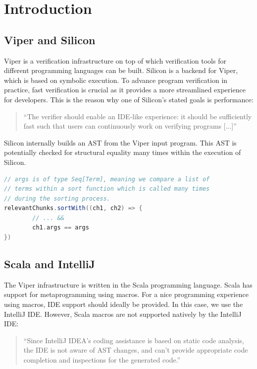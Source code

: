 \documentclass[11pt]{article}
\begin{document}
    \tableofcontents
    \newpage


    \section{Introduction}

    \subsection{Viper and Silicon} \label{background:viper}
    
    Viper \cite{viper} is a verification infrastructure on top of which verification tools
    for different programming languages can be built. Silicon \cite{silicon} is a backend for Viper,
    which is based on symbolic execution. To advance program verification in practice,
    fast verification is crucial as it provides a more streamlined experience for developers.
    This is the reason why one of Silicon's stated goals is performance:

    \begin{quote} 
        ``The verifier should enable an IDE-like experience: it should be
        sufficiently fast such that users can continuously work on verifying
        programs [...]'' \cite{silicon}
    \end{quote}

    Silicon internally builds an AST from the Viper input
    program. This AST is potentially checked for structural equality many times within
    the execution of Silicon.

    \begin{lstlisting}[language=Scala, caption=Example of multiple subtree (``term'') equality checks occuring during the execution of Silicon.]
// args is of type Seq[Term], meaning we compare a list of
// terms within a sort function which is called many times
// during the sorting process.
relevantChunks.sortWith((ch1, ch2) => {
        // ... &&
        ch1.args == args
})
    \end{lstlisting}

    \subsection{Scala and IntelliJ} \label{background:scala}

    The Viper infrastructure is written in the Scala programming language.
    Scala has support for metaprogramming using macros. For a nice programming experience
    using macros, IDE support should ideally be provided. In this case, we use the IntelliJ IDE.
    However, Scala macros are not supported natively by the IntelliJ IDE:
    \begin{quote}
        ``Since IntelliJ IDEA’s coding assistance is based on static code analysis,
        the IDE is not aware of AST changes, and can’t provide appropriate code
        completion and inspections for the generated code.'' \cite{intellij}
    \end{quote}
\end{document}
